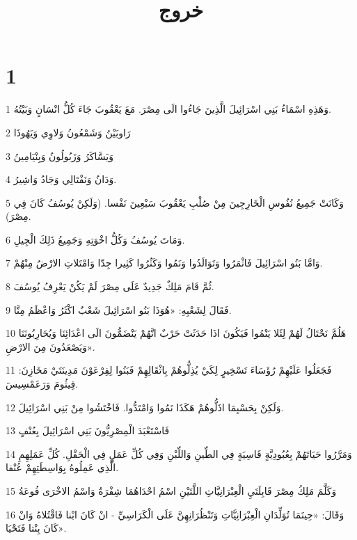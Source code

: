 

\title{خروج}


\chapter{1}

\par 1 وَهَذِهِ اسْمَاءُ بَنِي اسْرَائِيلَ الَّذِينَ جَاءُوا الَى مِصْرَ. مَعَ يَعْقُوبَ جَاءَ كُلُّ انْسَانٍ وَبَيْتُهُ.
\par 2 رَاوبَيْنُ وَشَمْعُونُ وَلاوِي وَيَهُوذَا
\par 3 وَيَسَّاكَرُ وَزَبُولُونُ وَبِنْيَامِينُ
\par 4 وَدَانُ وَنَفْتَالِي وَجَادُ وَاشِيرُ.
\par 5 وَكَانَتْ جَمِيعُ نُفُوسِ الْخَارِجِينَ مِنْ صُلْبِ يَعْقُوبَ سَبْعِينَ نَفْسا. (وَلَكِنْ يُوسُفُ كَانَ فِي مِصْرَ).
\par 6 وَمَاتَ يُوسُفُ وَكُلُّ اخْوَتِهِ وَجَمِيعُ ذَلِكَ الْجِيلِ.
\par 7 وَامَّا بَنُو اسْرَائِيلَ فَاثْمَرُوا وَتَوَالَدُوا وَنَمُوا وَكَثُرُوا كَثِيرا جِدّا وَامْتَلاتِ الارْضُ مِنْهُمْ.
\par 8 ثُمَّ قَامَ مَلِكٌ جَدِيدٌ عَلَى مِصْرَ لَمْ يَكُنْ يَعْرِفُ يُوسُفَ.
\par 9 فَقَالَ لِشَعْبِهِ: «هُوَذَا بَنُو اسْرَائِيلَ شَعْبٌ اكْثَرُ وَاعْظَمُ مِنَّا.
\par 10 هَلُمَّ نَحْتَالُ لَهُمْ لِئَلا يَنْمُوا فَيَكُونَ اذَا حَدَثَتْ حَرْبٌ انَّهُمْ يَنْضَمُّونَ الَى اعْدَائِنَا وَيُحَارِبُونَنَا وَيَصْعَدُونَ مِنَ الارْضِ».
\par 11 فَجَعَلُوا عَلَيْهِمْ رُؤَسَاءَ تَسْخِيرٍ لِكَيْ يُذِلُّوهُمْ بِاثْقَالِهِمْ فَبَنُوا لِفِرْعَوْنَ مَدِينَتَيْ مَخَازِنَ: فِيثُومَ وَرَعَمْسِيسَ.
\par 12 وَلَكِنْ بِحَسْبِمَا اذَلُّوهُمْ هَكَذَا نَمُوا وَامْتَدُّوا. فَاخْتَشُوا مِنْ بَنِي اسْرَائِيلَ.
\par 13 فَاسْتَعْبَدَ الْمِصْرِيُّونَ بَنِي اسْرَائِيلَ بِعُنْفٍ
\par 14 وَمَرَّرُوا حَيَاتَهُمْ بِعُبُودِيَّةٍ قَاسِيَةٍ فِي الطِّينِ وَاللِّبْنِ وَفِي كُلِّ عَمَلٍ فِي الْحَقْلِ. كُلِّ عَمَلِهِمِ الَّذِي عَمِلُوهُ بِوَاسِطَتِهِمْ عُنْفا.
\par 15 وَكَلَّمَ مَلِكُ مِصْرَ قَابِلَتَيِ الْعِبْرَانِيَّاتِ اللَّتَيْنِ اسْمُ احْدَاهُمَا شِفْرَةُ وَاسْمُ الاخْرَى فُوعَةُ
\par 16 وَقَالَ: «حِينَمَا تُوَلِّدَانِ الْعِبْرَانِيَّاتِ وَتَنْظُرَانِهِنَّ عَلَى الْكَرَاسِيِّ - انْ كَانَ ابْنا فَاقْتُلاهُ وَانْ كَانَ بِنْتا فَتَحْيَا».
